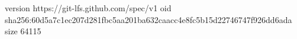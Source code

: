 version https://git-lfs.github.com/spec/v1
oid sha256:60d5a7c1ec207d281fbc5aa201ba632caacc4e8fc5b15d22746747f926dd6ada
size 64115

